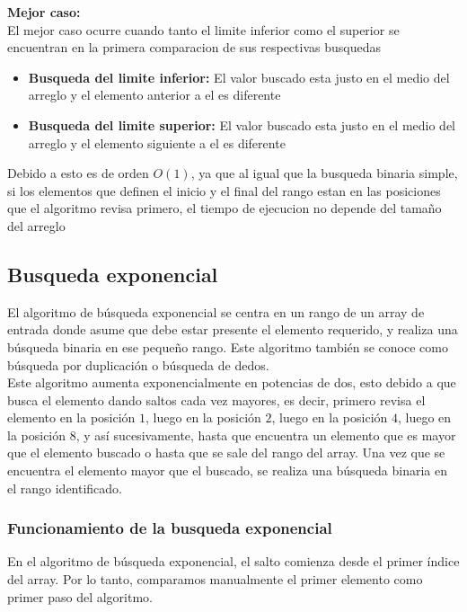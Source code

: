\documentclass[9pt,letterpaper,onecolumn]{rho-class/rho}
\begin{document}
        \textbf{Mejor caso:}\\
        El mejor caso ocurre cuando tanto el limite inferior como el superior se encuentran en la primera comparacion de sus respectivas busquedas
        \begin{itemize}
            \item \textbf{Busqueda del limite inferior:} El valor buscado esta justo en el medio del arreglo y el elemento anterior a el es diferente
            \item \textbf{Busqueda del limite superior:} El valor buscado esta justo en el medio del arreglo y el elemento siguiente a el es diferente
        \end{itemize}
        Debido a esto es de orden $O(1)$, ya que al igual que la busqueda binaria simple, si los elementos que definen el inicio y el final
        del rango estan en las posiciones que el algoritmo revisa primero, el tiempo de ejecucion no depende del tamaño del arreglo

    \subsection{Busqueda exponencial}
    El algoritmo de búsqueda exponencial se centra en un rango de un array de entrada donde 
    asume que debe estar presente el elemento requerido, y realiza una búsqueda binaria en 
    ese pequeño rango. Este algoritmo también se conoce como búsqueda por duplicación o 
    búsqueda de dedos.\\

    Este algoritmo aumenta exponencialmente en potencias de dos, esto debido a que
    busca el elemento dando saltos cada vez mayores, es decir, primero revisa el elemento 
    en la posición $1$, luego en la posición $2$, luego en la posición $4$, luego en la 
    posición $8$, y así sucesivamente, hasta que encuentra un elemento que es mayor que el 
    elemento buscado o hasta que se sale del rango del array. Una vez que se encuentra el 
    elemento mayor que el buscado, se realiza una búsqueda binaria en el rango identificado.\\

    \subsubsection{Funcionamiento de la busqueda exponencial}
    En el algoritmo de búsqueda exponencial, el salto comienza desde el primer índice del array. Por lo tanto, comparamos manualmente el
    primer elemento como primer paso del algoritmo.
\end{document}
